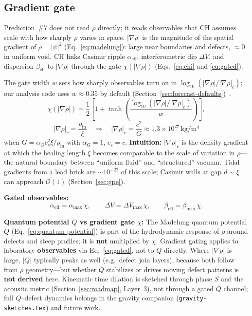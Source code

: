 \documentclass[11pt,a4paper]{article}
\begin{document}
\subsection{Gradient gate}

Prediction~\#7 does not read $\rho$ directly; it reads observables that CH assumes scale with how sharply $\rho$ varies in space.
$|\nabla\rho|$ is the magnitude of the spatial gradient of $\rho = |\psi|^2$ (Eq.~\ref{eq:madelung}): large near boundaries and defects, $\approx 0$ in uniform void.
CH links Casimir ripple $\alpha_{\mathrm{eff}}$, interferometric dip $\Delta V$, and dispersion $\beta_{\mathrm{eff}}$ to $|\nabla\rho|$ through the gate $\chi(|\nabla\rho|)$ (Eqs.~\ref{eq:chi} and \ref{eq:gated}).

The gate width $w$ sets how sharply observables turn on in $\log_{10}(|\nabla\rho|/|\nabla\rho|_c)$; our analysis code uses $w \approx 0.35$ by default (Section~\ref{sec:forecast-defaults})~\cite{CHSpaceFabric2026}.
\begin{equation}
  \chi(|\nabla\rho|) = \frac{1}{2}\left[1 + \tanh\!\left(\frac{\log_{10}(|\nabla\rho|/|\nabla\rho|_c)}{w}\right)\right],
  \label{eq:chi}
\end{equation}
\begin{equation}
  |\nabla\rho|_c = \frac{\rho_{\mathrm{in}}}{\xi}
  \quad\Rightarrow\quad
  |\nabla\rho|_c = \frac{c^2}{G} \approx 1.3\times 10^{27}\,\si{\kilogram\per\meter\tothe{4}}
  \label{eq:grad-crit}
\end{equation}
when $G = \alpha_G c_s^2 \xi/\rho_{\mathrm{in}}$ with $\alpha_G = 1$, $c_s = c$.
\textbf{Intuition:} $|\nabla\rho|_c$ is the density gradient at which the healing length $\xi$ becomes comparable to the scale of variation in $\rho$---the natural boundary between ``uniform fluid'' and ``structured'' vacuum.
Tidal gradients from a lead brick are $\sim 10^{-22}$ of this scale; Casimir walls at gap $d \sim \xi$ can approach $\mathcal{O}(1)$ (Section~\ref{sec:gpe}).

\textbf{Gated observables:}
\begin{equation}
  \alpha_{\mathrm{eff}} = \alpha_{\max}\,\chi, \qquad
  \Delta V = \Delta V_{\max}\,\chi, \qquad
  \beta_{\mathrm{eff}} = \beta_{\max}\,\chi.
  \label{eq:gated}
\end{equation}

\textbf{Quantum potential $Q$ vs gradient gate $\chi$:}
The Madelung quantum potential $Q$ (Eq.~\ref{eq:quantum-potential}) is part of the hydrodynamic response of $\rho$ around defects and steep profiles; it is \textbf{not} multiplied by $\chi$.
Gradient gating applies to laboratory \textbf{observables} via Eq.~\ref{eq:gated}, not to $Q$ directly.
Where $|\nabla\rho|$ is large, $|Q|$ typically peaks as well (e.g.\ defect join layers), because both follow from $\rho$ geometry---but whether $Q$ stabilizes or drives moving defect patterns is \textbf{not derived} here.
Kinematic time dilation is sketched through phase $S$ and the acoustic metric (Section~\ref{sec:roadmap}, Layer~3), not through a gated $Q$ channel; full $Q$--defect dynamics belongs in the gravity companion (\texttt{gravity-sketches.tex}) and future work.
\end{document}
